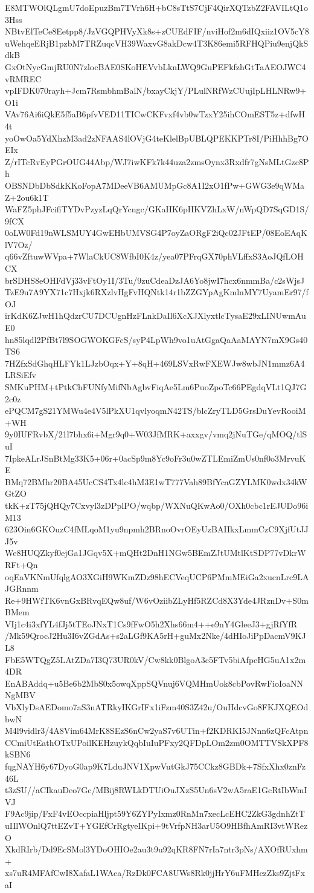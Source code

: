 E8MTWOlQLgmU7doEpuzBm7TVrh6H+bC8sTtS7CjF4QirXQTzbZ2FAVILtQ1o3Hss
NBtvElTeCe8Eetpp8/JzVGQPHVyXk8s+zCUEdFIF/nviHof2m6dIQxiiz1OV5cY8
uWehqeERjB1pzbM7TRZuqcVH39WaxvG8akDcw4T3K86emi5RFHQPiu9enjQkSdkB
GxOtNycGmjRU0N7zlocBAE0SKoHEVvbLknLWQ9GuPEFkfzhGtTaAEOJWC4vRMREC
vpIFDK070rayh+Jcm7RsmbhmBalN/bxayCkjY/PLulNRfWzCUujIpLHLNRw9+O1i
VAv76Ai6iQkE5f5aB6pfvVED11TICwCKFvxf4vb0wTzxY25ihCOmEST5z+dfwH4t
yoOwOa5YdXhzM3ad2zNFAAS4lOVjG4teKlelBpUBLQPEKKPTr8I/PiHhhBg7OEIx
Z/rITcRvEyPGrOUG44Abp/WJ7iwKFk7k44uza2zmsOynx3Rxdfr7gNsMLtGzc8Ph
OBSNDbDbSdkKKoFopA7MDeeVB6AMUMpGc8A1I2xO1fPw+GWG3e9qWMaZ+2ou6k1T
WaFZ5phJFcifiTYDvPzyzLqQrYcngc/GKaHK6pHKVZhLxW/nWpQD7SqGD1S/9fCX
0oLW0Fd19nWLSMUY4GwEHbUMVSG4P7oyZaORgF2iQc02JFtEP/08EoEAqKlV7Oz/
q66vZftuwWVpa+7WlaCkUC8WfbI0K4z/yea07PFrqGX70phVLffxS3AoJQfLOHCX
brSDHS8eOHFdVj33vFtOy1I/3Tu/9zuCdeaDzJA6Yo8jwI7hcx6nmmBa/c2sWjsJ
TzE9u7A9YX71c7Hxjk6RXzlvHgFvHQNtk14r1bZZGYpAgKmlnMY7UyamEr97/fOJ
irKdK6ZJwH1hQdzrCU7DCUgnHzFLnkDaIl6XcXJXlyxtlcTysaE29xLINUwmAuE0
hn85lqdl2PfBt7l9SOGWOKGFcS/syP4LpWh9vo1uAtGgaQaAaMAYN7mX9Gs40TS6
7HZfxSdGhqHLFYk1LJzbOqx+Y+8qH+469LSVxRwFXEWJw8wbJN1mmz6A4LRSiEfv
SMKuPHM+tPtkChFUNfyMifNbAgbvFiqAe5Lm6PuoZpoTc66PEgdqVLt1QJ7G2c0z
ePQCM7gS21YMWu4e4V5lPkXU1qvlyoqmN42TS/blcZryTLD5GrsDuYevRooiM+WH
9y0IUFRvbX/21l7bhx6i+Mgr9q0+W03JfMRK+axxgv/vmq2jNuTGe/qMOQ/tlSuI
7IpkeALrJSnBtMg33K5+06r+0acSp9m8Yc9oFr3u0wZTLEmiZmUs0nf0o3MrvuKE
BMq72BMhr20BA45UcCS4Tx4lc4hM3E1wT777Vah89BfYcaGZYLMK0wdx34kWGtZO
tkK+zT75jQHQy7Cxvyl3zDPplPO/wqbp/WXNuQKwAo0/OXh0cbc1rEJUDo96iM13
623Oin6GKOuzC4fMLqoM1yu9npmh2BRnoOvrOEyUzBAIIkxLmmCzC9XjfUtJJJ5v
We8HUQZkyf0ejGa1JGqv5X+mQHt2DnH1NGw5BEmZJtUMtlKtSDP77vDkrWRFt+Qn
oqEaVKNmUfqlgAO3XGiH9WKmZDz98hECVeqUCP6PMmMEiGa2xucnLrc9LAJGRnnm
Re+9HWfTK6vnGxBRvqEQw8uf/W6vOziibZLyHf5RZCd8X3Yde4JRznDv+S0mBMem
VIj1c4i3xfYL4fJj5tTEoJNxT1Cs9fFwO5h2Xhs66m4++e9nY4GleeJ3+gjRfYfR
/Mk59QrocJ2Hu3I6vZGdAs+s2aLGf9KA5rH+guMx2Nke/4dHIoJiPpDacmV9KJL8
FbE5WTQgZ5LAtZDa7I3Q73UR0kV/Cw8kk0BlgoA3c5FTv5biAfpeHG5uA1x2m4DR
EnABAddq+u5Be6b2MbS0x5owqXppSQVnuj6VQMHmUok8cbPovRwFioIoaNNNgMBV
VbXlyDsAEDomo7aS3nATRkyIKGrIFx1iFzm40S3Z42u/OuHdcvGo8FKJXQEOdbwN
M4l9vidlr3/4A8Vim64MrK8SEzS6nCw2yaS7v6UTin+f2KDRKI5JNnn6zQFcAtpn
CCmiUtEathOTxUPoilKEHzuykQqbIuIuPFxy2QFDpLOm2zm0OMTTVSkXPF8kSBN6
fqgNAYH6y67DyoG0ap9K7LduJNV1XpwVutGkJ75CCkz8GBDk+7SfxXhx0znFz46L
t3zSU//aCIkauDeo7Gc/MBij8RWLkDTUiOuJXzS5Un6sV2wA5raE1GcRtIbWmIVJ
F9Ac9jip/FxF4vEOccpiaHljpt59Y6ZYPyIxmz0RnMn7xecLcEHC2ZkG3gdnhZtT
uIIlWOnlQ7ttEZvT+YGEfCrRgtyeIKpi+9tVrfpNH3arU5O9HBfhAmRI3vtWRezO
XkdRIrb/Dd9EcSMol3YDoOHIOe2au3t9u92qKR8FN7rIa7ntr3pNs/AXOfRUxhm+
xs7uR4MFAfCwI8XafaL1WAca/RzDk0FCA8UWs8Rk0jjHrY6uFMHczZks9ZjtFxaI
